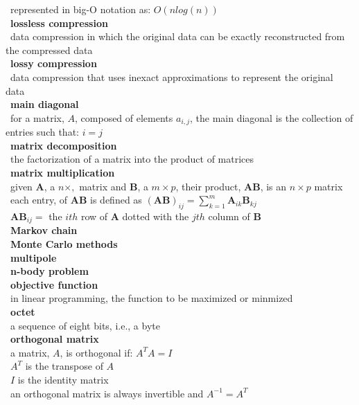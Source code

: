 \documentclass[10pt,letterpaper]{scrartcl}
\newcommand{\tbul}{\textbullet}
\newcommand{\tend}{\>\textendash}
\newcommand{\tasc}{\>\>\textasteriskcentered}
\begin{document}
\begin{tabbing}
    \tend\ represented in big-O notation as: $O(nlog(n))$ \\
\tbul\ \textbf{lossless compression} \\ 
    \tend\ data compression in which the original data can be exactly reconstructed from the compressed data \\
\tbul\ \textbf{lossy compression} \\ 
    \tend\ data compression that uses inexact approximations to represent the original data \\
\tbul\ \textbf{main diagonal} \\
    \tend\ for a matrix, $A$, composed of elements $a_{i,j}$, the main diagonal is the collection of entries such that: $i=j$ \\
\tbul\ \textbf{matrix decomposition} \\
    \tend\ the factorization of a matrix into the product of matrices \\
\tbul\ \textbf{matrix multiplication} \\
    \tend\ given $\mathbf{A}$, a $n\times ,$ matrix and $\mathbf{B}$, a $m\times p$, their product, $\mathbf{AB}$, is an $n\times p$ matrix\\
    \tend\ each entry, of $\mathbf{AB}$ is defined as $\displaystyle (\mathbf{AB})_{ij} = \sum_{k=1}^{m}\mathbf{A}_{ik}\mathbf{B}_{kj}$ \\
    \tend\ $\mathbf{AB}_{ij}=$ the $ith$ row of $\mathbf{A}$ dotted with the $jth$ column of $\mathbf{B}$ \\
\tbul\ \textbf{Markov chain} \\
\tbul\ \textbf{Monte Carlo methods} \\
\tbul\ \textbf{multipole} \\
\tbul\ \textbf{n-body problem} \\
\tbul\ \textbf{objective function} \\
    \tend\ in linear programming, the function to be maximized or minmized \\
\tbul\ \textbf{octet} \\ 
    \tend\ a sequence of eight bits, i.e., a byte \\
\tbul\ \textbf{orthogonal matrix} \\
    \tend\ a matrix, $A$, is orthogonal if: $A^TA=I$ \\
        \tasc\ $A^T$ is the transpose of $A$ \\
        \tasc\ $I$ is the identity matrix \\
    \tend\ an orthogonal matrix is always invertible and $A^{-1} = A^T$ \\

\end{tabbing}
\end{document}

